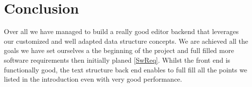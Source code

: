 \section{Conclusion}\label{sec:conclusion}
Over all we have managed to build a really good editor backend that leverages our customized and well adapted data structure concepts. We are achieved all the goals we have set ourselves a the beginning of the project and full filled more software requirements then initially planed \ref{SwReq}. Whilst the front end is functionally good, the text structure back end enables to full fill all the points we listed in the introduction even with very good performance.